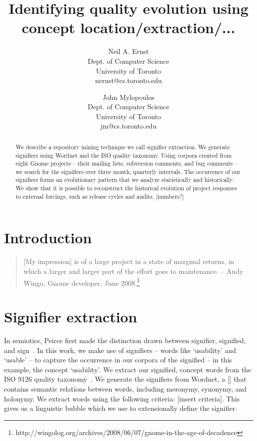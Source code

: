 \documentclass[conference, compsoc]{IEEEtran}
\begin{document}


\title{Identifying quality evolution using concept location/extraction/...}
\author{
Neil A. Ernst\\Dept. of Computer Science\\University of Toronto\\nernst@cs.toronto.edu \and
John Mylopoulos\\Dept. of Computer Science\\University of Toronto\\jm@cs.toronto.edu }

\maketitle
\thispagestyle{empty}

\begin{abstract}
We describe a repository mining technique we call signifier extraction. We generate signifiers using Wordnet and the ISO quality taxonomy. Using corpora created from eight Gnome projects -- their mailing lists, subversion comments, and bug comments -- we search for the signifiers over three month, quarterly intervals. The occurrence of our signifiers forms an evolutionary pattern that we analyze statistically and historically. We show that it is possible to reconstruct the historical evolution of project responses to external forcings, such as release cycles and audits. [numbers?]
\end{abstract}

\vspace{-2mm}
\section{Introduction}\label{sect:introduction}
\begin{quote}[My impression] is of a large project in a state of marginal returns, in which a larger and larger part of the effort goes to maintenance. -- Andy Wingo, Gnome developer, June 2008.\footnote{http://wingolog.org/archives/2008/06/07/gnome-in-the-age-of-decadence}\end{quote}
	
\section{Signifier extraction}
In semiotics, Peirce first made the distinction drawn between signifier, signified, and sign~\cite{atkin2006}. In this work, we make use of signifiers -- words like `usability' and `usable' -- to capture the occurrence in our corpora of the signified -- in this example, the concept `usability'. We extract our signified, concept words from the ISO 9126 quality taxonomy~\cite{iso9126}. We generate the signifiers from Wordnet, a [] that contains semantic relations between words, including meronymy, synonymy, and holonymy. We extract words using the following criteria: [insert criteria]. This gives us a linguistic bubble which we use to extensionally define the signifier.
\vspace{-2mm}
\begin{footnotesize}

\end{footnotesize}
\end{document}

